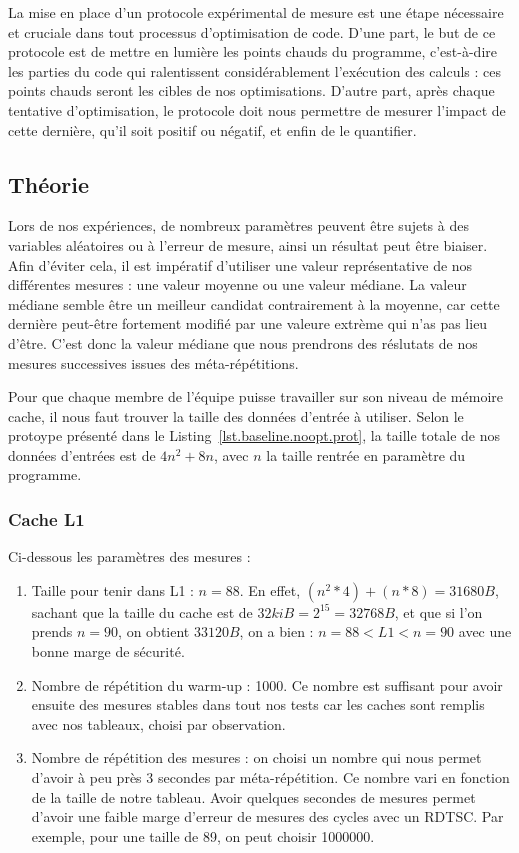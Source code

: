 \documentclass[12pt,a4paper]{article}
\begin{document}
La mise en place d'un protocole expérimental de mesure est une étape nécessaire
et cruciale dans tout processus d'optimisation de code. D'une part, le but de ce
protocole est de mettre en lumière les points chauds du programme, c'est-à-dire
les parties du code qui ralentissent considérablement l'exécution des calculs :
ces points chauds seront les cibles de nos optimisations. D'autre part, après
chaque tentative d'optimisation, le protocole doit nous permettre de mesurer
l'impact de cette dernière, qu'il soit positif ou négatif, et enfin de le
quantifier.

\subsection{Théorie}

Lors de nos expériences, de nombreux paramètres peuvent être sujets à des
variables aléatoires ou à l'erreur de mesure, ainsi un résultat peut être
biaiser. Afin d'éviter cela, il est impératif d'utiliser une valeur
représentative de nos différentes mesures : une valeur moyenne ou une valeur
médiane. La valeur médiane semble être un meilleur candidat contrairement à la
moyenne, car cette dernière peut-être fortement modifié par une valeure extrème
qui n'as pas lieu d'être. C'est donc la valeur médiane que nous prendrons des
réslutats de nos mesures successives issues des méta-répétitions.

Pour que chaque membre de l'équipe puisse travailler sur son niveau de mémoire
cache, il nous faut trouver la taille des données d'entrée à utiliser. Selon le
protoype présenté dans le Listing~\ref{lst.baseline.noopt.prot}, la taille
totale de nos données d'entrées est de $4n^2 + 8n$, avec $n$ la taille rentrée
en paramètre du programme.

\subsubsection{Cache L1}

Ci-dessous les paramètres des mesures :
\begin{enumerate}[(1)]
    \item Taille pour tenir dans L1 : $n = 88$.
        En effet, $(n^2 * 4) + (n * 8) = 31680 B$, sachant que la taille du
        cache est de $32 kiB = 2^{15} = 32768 B$, et que si l'on prends $n =
        90$, on obtient $33120 B$, on a bien : $n = 88 < L1 < n = 90$ avec une
        bonne marge de sécurité.
    \item Nombre de répétition du warm-up : 1000. Ce nombre est suffisant pour
        avoir ensuite des mesures stables dans tout nos tests car les caches
        sont remplis avec nos tableaux, choisi par observation.
    \item Nombre de répétition des mesures : on choisi un nombre qui nous permet
        d'avoir à peu près 3 secondes par méta-répétition. Ce nombre vari en
        fonction de la taille de notre tableau. Avoir quelques secondes de
        mesures permet d'avoir une faible marge d'erreur de mesures des cycles
        avec un RDTSC. Par exemple, pour une taille de 89, on peut choisir
        1000000.
\end{enumerate}
\end{document}
